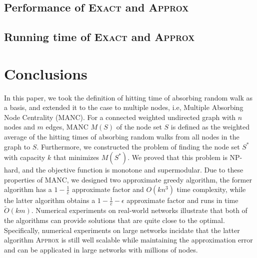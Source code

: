 \documentclass[sigconf]{acmart}
\begin{document}


\subsection{Performance of \textsc{Exact} and \textsc{Approx}}

\subsection{Running time of \textsc{Exact} and \textsc{Approx}}

\section{Conclusions}

In this paper, we took the definition of hitting time of absorbing random walk as a basis, and extended it to the case to multiple nodes, i.e, Multiple Absorbing Node Centrality (MANC).
For a connected weighted undirected graph with \(n\) nodes and \(m\) edges, MANC \(M(S)\) of the node set \(S\) is defined as the weighted average of the hitting times of absorbing random walks from all nodes in the graph to \(S\).
Furthermore, we constructed the problem of finding the node set \(S^*\) with capacity \(k\) that minimizes \(M(S^*)\).
We proved that this problem is NP-hard, and the objective function is monotone and supermodular.
Due to these properties of MANC, we designed two approximate greedy algorithm, the former algorithm has a \(1-\frac1e\) approximate factor and \(O(kn^3)\) time complexity, while the latter algorithm obtains a \(1-\frac1e-\epsilon\) approximate factor and runs in time \(\tilde{O}(km)\).
Numerical experiments on real-world networks illustrate that both of the algorithms can provide solutions that are quite close to the optimal.
Specifically, numerical experiments on large networks incidate that the latter algorithm \textsc{Approx} is still well scalable while maintaining the approximation error and can be applicated in large networks with millions of nodes.


\balance

\end{document}
